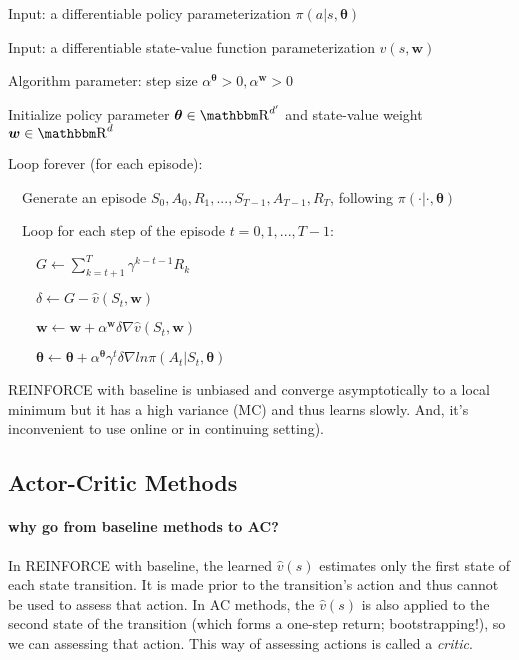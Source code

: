 \documentclass[sutton_barto_notes.tex]{subfiles}
\begin{document}
\begin{tcolorbox}[width=1.1\textwidth,title={REINFORCE with baseline (episodic) for estimating $\pi_*$}]
Input: a differentiable policy parameterization $\pi(a|s,\bm{\theta})$

Input: a differentiable state-value function parameterization $\hat{v}(s,\bm{w})$

Algorithm parameter: step size $\alpha^{\bm{\theta}} > 0, \alpha^{\bm{w}} > 0$

Initialize policy parameter $\bm{\theta} \in \R^{d'}$ and state-value weight $\bm{w} \in \R^d$

Loop forever (for each episode):

$\quad$Generate an episode $S_0,A_0,R_1,...,S_{T-1},A_{T-1},R_T$, following $\pi(\cdot|\cdot,\bm{\theta})$

$\quad$Loop for each step of the episode $t=0,1,...,T-1$:

$\quad\quad G\leftarrow\sum_{k=t+1}^T \gamma^{k-t-1}R_k$

$\quad\quad \delta\leftarrow G - \hat{v}(S_t, \bm{w})$

$\quad\quad \bm{w} \leftarrow \bm{w} + \alpha^{\bm{w}}\delta\nabla\hat{v}(S_t,\bm{w})$

$\quad\quad\bm{\theta}\leftarrow\bm{\theta}+\alpha^{\bm{\theta}}\gamma^t \delta \nabla ln\pi(A_t | S_t, \bm{\theta})$
\end{tcolorbox}

REINFORCE with baseline is unbiased and converge asymptotically to a local minimum but it has a high variance (MC) and thus learns slowly.
And, it’s inconvenient to use online or in continuing setting).


\subsection{Actor-Critic Methods}

\paragraph{why go from baseline methods to AC?} In REINFORCE with baseline, the learned $\hat{v}(s)$ estimates only the first state of each state transition. It is made prior to the transition's action and thus cannot be used to assess that action. In AC methods, the $\hat{v}(s)$ is also applied to the second state of the transition (which forms a one-step return; bootstrapping!), so we can assessing that action. This way of assessing actions is called a \textit{critic}.
\end{document}
